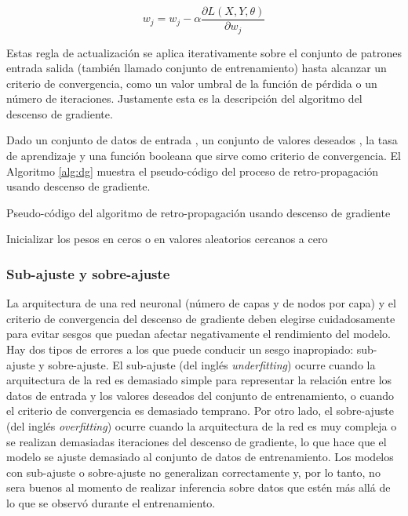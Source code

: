 \begin{equation}
    \label{eq:gd-update-rule-item}
    w_{j} = w_{j} - \alpha \frac{\partial L(X, Y, \theta)}{\partial w_{j}}
\end{equation}

Estas regla de actualización se aplica iterativamente sobre el conjunto de patrones entrada salida (también llamado conjunto de entrenamiento) hasta alcanzar un criterio de convergencia, como un valor umbral de la función de pérdida o un número de iteraciones. Justamente esta es la descripción del algoritmo del descenso de gradiente.

Dado un conjunto de datos de entrada , un conjunto de valores deseados , la tasa de aprendizaje \jim{\alpha} y una función booleana  que sirve como criterio de convergencia. El Algoritmo \ref{alg:dg} muestra el pseudo-código del proceso de retro-propagación usando descenso de gradiente.

\begin{algorithm}
\caption{Pseudo-código del algoritmo de retro-propagación usando descenso de gradiente}
\label{alg:dg}
\KwResult{\jim{\theta}}

Inicializar los pesos \jim{\theta} en ceros o en valores aleatorios cercanos a cero

\end{algorithm}

\subsubsection{Sub-ajuste y sobre-ajuste}

La arquitectura de una red neuronal (número de capas y de nodos por capa) y el criterio de convergencia del descenso de gradiente deben elegirse cuidadosamente para evitar sesgos que puedan afectar negativamente el rendimiento del modelo. Hay dos tipos de errores a los que puede conducir un sesgo inapropiado: sub-ajuste y sobre-ajuste. El sub-ajuste (del inglés \textit{underfitting}) ocurre cuando la arquitectura de la red es demasiado simple para representar la relación entre los datos de entrada y los valores deseados del conjunto de entrenamiento, o cuando el criterio de convergencia es demasiado temprano. Por otro lado, el sobre-ajuste (del inglés \textit{overfitting}) ocurre cuando la arquitectura de la red es muy compleja o se realizan demasiadas iteraciones del descenso de gradiente, lo que hace que el modelo se ajuste demasiado al conjunto de datos de entrenamiento. Los modelos con sub-ajuste o sobre-ajuste no generalizan correctamente y, por lo tanto, no sera buenos al momento de realizar inferencia sobre datos que estén más allá de lo que se observó durante el entrenamiento.

